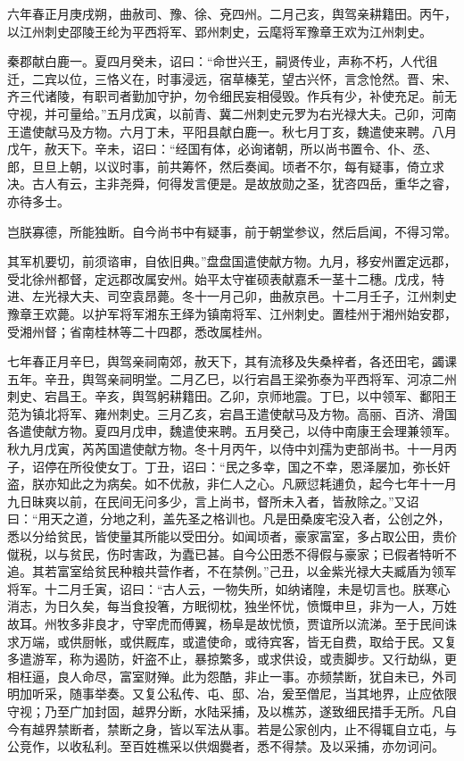 \documentclass[12pt,UTF8]{ctexbook}
\begin{document}
六年春正月庚戌朔，曲赦司、豫、徐、兗四州。二月己亥，舆驾亲耕籍田。丙午，以江州刺史邵陵王纶为平西将军、郢州刺史，云麾将军豫章王欢为江州刺史。

秦郡献白鹿一。夏四月癸未，诏曰：“命世兴王，嗣贤传业，声称不朽，人代徂迁，二宾以位，三恪义在，时事浸远，宿草榛芜，望古兴怀，言念怆然。晋、宋、齐三代诸陵，有职司者勤加守护，勿令细民妄相侵毁。作兵有少，补使充足。前无守视，并可量给。”五月戊寅，以前青、冀二州刺史元罗为右光禄大夫。己卯，河南王遣使献马及方物。六月丁未，平阳县献白鹿一。秋七月丁亥，魏遣使来聘。八月戊午，赦天下。辛未，诏曰：“经国有体，必询诸朝，所以尚书置令、仆、丞、郎，旦旦上朝，以议时事，前共筹怀，然后奏闻。顷者不尔，每有疑事，倚立求决。古人有云，主非尧舜，何得发言便是。是故放勋之圣，犹咨四岳，重华之睿，亦待多士。

岂朕寡德，所能独断。自今尚书中有疑事，前于朝堂参议，然后启闻，不得习常。

其军机要切，前须谘审，自依旧典。”盘盘国遣使献方物。九月，移安州置定远郡，受北徐州都督，定远郡改属安州。始平太守崔硕表献嘉禾一茎十二穗。戊戌，特进、左光禄大夫、司空袁昂薨。冬十一月己卯，曲赦京邑。十二月壬子，江州刺史豫章王欢薨。以护军将军湘东王绎为镇南将军、江州刺史。置桂州于湘州始安郡，受湘州督；省南桂林等二十四郡，悉改属桂州。

七年春正月辛巳，舆驾亲祠南郊，赦天下，其有流移及失桑梓者，各还田宅，蠲课五年。辛丑，舆驾亲祠明堂。二月乙巳，以行宕昌王梁弥泰为平西将军、河凉二州刺史、宕昌王。辛亥，舆驾躬耕籍田。乙卯，京师地震。丁巳，以中领军、鄱阳王范为镇北将军、雍州刺史。三月乙亥，宕昌王遣使献马及方物。高丽、百济、滑国各遣使献方物。夏四月戊申，魏遣使来聘。五月癸己，以侍中南康王会理兼领军。秋九月戊寅，芮芮国遣使献方物。冬十月丙午，以侍中刘孺为吏部尚书。十一月丙子，诏停在所役使女丁。丁丑，诏曰：“民之多幸，国之不幸，恩泽屡加，弥长奸盗，朕亦知此之为病矣。如不优赦，非仁人之心。凡厥愆耗逋负，起今七年十一月九日昧爽以前，在民间无问多少，言上尚书，督所未入者，皆赦除之。”又诏曰：“用天之道，分地之利，盖先圣之格训也。凡是田桑废宅没入者，公创之外，悉以分给贫民，皆使量其所能以受田分。如闻顷者，豪家富室，多占取公田，贵价僦税，以与贫民，伤时害政，为蠹已甚。自今公田悉不得假与豪家；已假者特听不追。其若富室给贫民种粮共营作者，不在禁例。”己丑，以金紫光禄大夫臧盾为领军将军。十二月壬寅，诏曰：“古人云，一物失所，如纳诸隍，未是切言也。朕寒心消志，为日久矣，每当食投箸，方眠彻枕，独坐怀忧，愤慨申旦，非为一人，万姓故耳。州牧多非良才，守宰虎而傅翼，杨阜是故忧愤，贾谊所以流涕。至于民间诛求万端，或供厨帐，或供厩库，或遣使命，或待宾客，皆无自费，取给于民。又复多遣游军，称为遏防，奸盗不止，暴掠繁多，或求供设，或责脚步。又行劫纵，更相枉逼，良人命尽，富室财殚。此为怨酷，非止一事。亦频禁断，犹自未已，外司明加听采，随事举奏。又复公私传、屯、邸、冶，爰至僧尼，当其地界，止应依限守视；乃至广加封固，越界分断，水陆采捕，及以樵苏，遂致细民措手无所。凡自今有越界禁断者，禁断之身，皆以军法从事。若是公家创内，止不得辄自立屯，与公竞作，以收私利。至百姓樵采以供烟爨者，悉不得禁。及以采捕，亦勿诃问。
\end{document}
